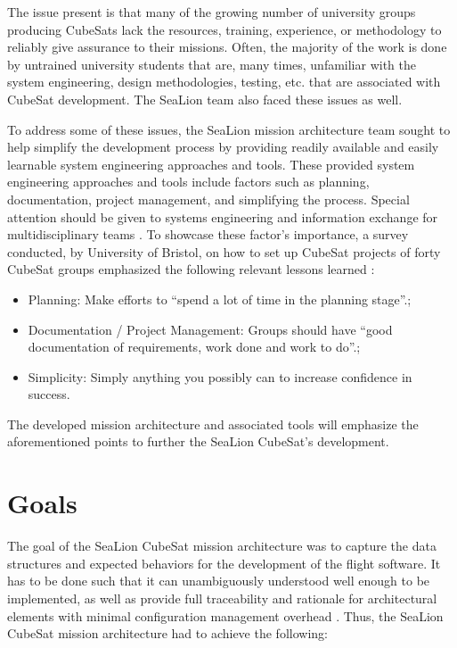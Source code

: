 \documentclass[journal,article,submit,pdftex,moreauthors]{Definitions/mdpi}
\begin{document}
The issue present is that many of the growing number of university groups producing CubeSats lack the resources, training, experience, or methodology to reliably give assurance to their missions.  Often, the majority of the work is done by untrained university students that are, many times, unfamiliar with the system engineering, design methodologies, testing, etc. that are associated with CubeSat development.  The SeaLion team also faced these issues as well.

To address some of these issues, the SeaLion mission architecture team sought to help simplify the development process by providing readily available and easily learnable system engineering approaches and tools.  These provided system engineering approaches and tools include factors such as planning, documentation, project management, and simplifying the process.  Special attention should be given to systems engineering and information exchange for multidisciplinary teams \cite{aalto}.  To showcase these factor's importance, a survey conducted, by University of Bristol, on how to set up CubeSat projects of forty CubeSat groups emphasized the following relevant lessons learned \cite{howtosetup}:

\begin{itemize}
	\item	Planning: Make efforts to “spend a lot of time in the planning stage”.;
	\item	Documentation / Project Management: Groups should have “good documentation of requirements, work done and work to do”.;
	\item	Simplicity: Simply anything you possibly can to increase confidence in success.
\end{itemize}

The developed mission architecture and associated tools will emphasize the aforementioned points to further the SeaLion CubeSat's development.

\section{Goals}

The goal of the SeaLion CubeSat mission architecture was to capture the data structures and expected behaviors for the development of the flight software.  It has to be done such that it can unambiguously understood well enough to be implemented, as well as provide full traceability and rationale for architectural elements with minimal configuration management overhead \cite{sealion_mission_architecture}.  Thus, the SeaLion CubeSat mission architecture had to achieve the following:
\end{document}
